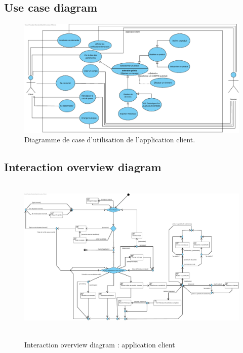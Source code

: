 \documentclass[]{report}
\begin{document}
\subsection{Use case diagram}



\begin{figure}[h]
	\centering\includegraphics[width=\linewidth]{img/Use Case Client.pdf}
	\caption{Diagramme de case d'utilisation de l'application client.}
\end{figure}

\newpage

\subsection{Interaction overview diagram}



\begin{figure}[h!]
\hbox{
	\centering\includegraphics[width=\linewidth]{img/Interaction Overview Client.pdf}
}
\caption{Interaction overview diagram : application client}
\end{figure}
\end{document}
